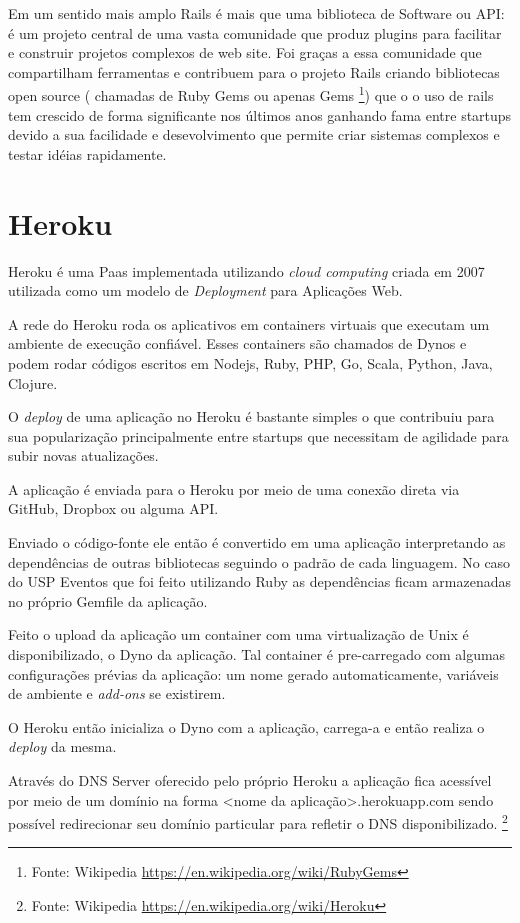     \par Em um sentido mais amplo Rails é mais que uma biblioteca de Software ou API: é um projeto central de uma vasta comunidade que produz plugins para facilitar e construir projetos complexos de web site. Foi graças a essa comunidade que compartilham ferramentas e contribuem para o projeto Rails criando bibliotecas open source ( chamadas de Ruby Gems ou apenas Gems \footnote{Fonte: Wikipedia \url{https://en.wikipedia.org/wiki/RubyGems}}) que o o uso de rails tem crescido de forma significante nos últimos anos ganhando fama entre startups devido a sua  facilidade e desevolvimento que permite criar sistemas complexos e testar idéias rapidamente.

\section{Heroku}
\par Heroku é uma Paas implementada utilizando \emph{cloud computing} criada em 2007 utilizada como um modelo de \emph{Deployment} para Aplicações Web.
\par A rede do Heroku roda os aplicativos em containers virtuais que executam um ambiente de execução confiável. Esses containers são chamados de Dynos e podem rodar códigos escritos em Nodejs, Ruby, PHP, Go, Scala, Python, Java, Clojure.
\par O \emph{deploy} de uma aplicação no Heroku é bastante simples o que contribuiu para sua popularização principalmente entre startups que necessitam de agilidade para subir novas atualizações.
\par A aplicação é enviada para o Heroku por meio de uma conexão direta via GitHub, Dropbox ou alguma API.
\par Enviado o código-fonte ele então é convertido em uma aplicação interpretando as dependências de outras bibliotecas seguindo o padrão de cada linguagem. No caso do USP Eventos que foi feito utilizando Ruby as dependências ficam armazenadas no próprio Gemfile da aplicação.
\par Feito o upload da aplicação um container com uma virtualização de Unix é disponibilizado, o Dyno da aplicação. Tal container é pre-carregado com algumas configurações prévias da aplicação: um nome gerado automaticamente, variáveis de ambiente e \emph{add-ons} se existirem.
\par O Heroku então inicializa o Dyno com a aplicação, carrega-a e então realiza o \emph{deploy} da mesma.
\par Através do DNS Server oferecido pelo próprio Heroku a aplicação fica acessível por meio de um domínio na forma <nome da aplicação>.herokuapp.com sendo possível redirecionar seu domínio particular para refletir o DNS disponibilizado. \footnote{Fonte: Wikipedia \url{https://en.wikipedia.org/wiki/Heroku}}
